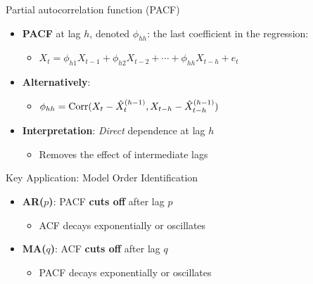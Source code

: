 \documentclass[9pt, aspectratio=169, t]{beamer}
\begin{document}
\begin{frame}{Partial autocorrelation function (PACF)}
    \begin{defn}
        \begin{itemize}\setlength{\itemsep}{0pt}
            \item \textbf{PACF} at lag $h$, denoted $\phi_{hh}$: the last coefficient in the regression:
            \begin{itemize}
                \item $X_t = \phi_{h1}X_{t-1} + \phi_{h2}X_{t-2} + \cdots + \phi_{hh}X_{t-h} + e_t$
            \end{itemize}
            \item \textbf{Alternatively}:
            \begin{itemize}
                \item $\phi_{hh} = \text{Corr}(X_t - \hat{X}_t^{(h-1)}, X_{t-h} - \hat{X}_{t-h}^{(h-1)})$
            \end{itemize}
            \item \textbf{Interpretation}: \textit{Direct} dependence at lag $h$
            \begin{itemize}
                \item Removes the effect of intermediate lags
            \end{itemize}
        \end{itemize}
    \end{defn}

    \begin{exampleblock}{Key Application: Model Order Identification}
        \begin{itemize}\setlength{\itemsep}{0pt}
            \item \textbf{AR($p$)}: PACF \textbf{cuts off} after lag $p$
            \begin{itemize}
                \item ACF decays exponentially or oscillates
            \end{itemize}
            \item \textbf{MA($q$)}: ACF \textbf{cuts off} after lag $q$
            \begin{itemize}
                \item PACF decays exponentially or oscillates
            \end{itemize}
        \end{itemize}
    \end{exampleblock}
\end{frame}
\end{document}
